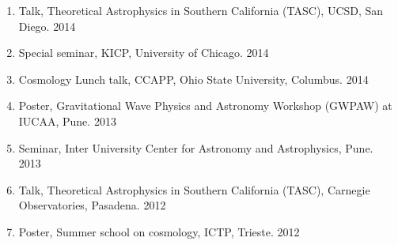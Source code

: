 \documentclass{article}
\newlength{\cvindent}
\newcommand{\cvsectionend}{\vspace{10pt}}
\newenvironment{cvlist}{%
  \begin{list}{}{%
    \setlength{\leftmargin}{\cvindent}%
    \setlength{\rightmargin}{0pt}%
    \setlength{\topsep}{0pt}%
    \setlength{\partopsep}{0pt}%
    \setlength{\parsep}{0pt}%
    \setlength{\itemsep}{0pt}%
  }%
  \item\relax
}{%
  \end{list}
}
\begin{document}
\begin{cvlist}
\begin{enumerate}
	       \item Talk, Theoretical Astrophysics in Southern California (TASC), UCSD, San Diego. \hfill 2014 
	       \item Special seminar, KICP, University of Chicago. \hfill 2014 
	       \item Cosmology Lunch talk, CCAPP, Ohio State University, Columbus. \hfill 2014 
	       \item Poster, Gravitational Wave Physics and Astronomy Workshop (GWPAW) at IUCAA, Pune. \hfill 2013 
	       \item Seminar, Inter University Center for Astronomy and Astrophysics, Pune. \hfill 2013	
	       \item Talk, Theoretical Astrophysics in Southern California (TASC), Carnegie Observatories, Pasadena. \hfill 2012
	       \item Poster, Summer school on cosmology, ICTP, Trieste. \hfill 2012
	\end{enumerate}
\end{cvlist}

\cvsectionend
%
%
%	       
%	       
%	       
%		
		
\end{document}
